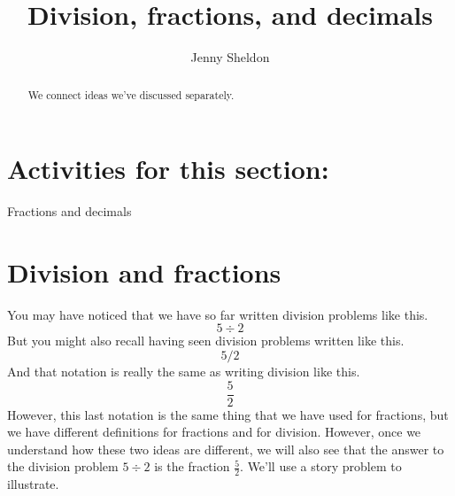 \documentclass{ximera}
\title{Division, fractions, and decimals}
\author{Jenny Sheldon}
\begin{document}
\begin{abstract}
We connect ideas we've discussed separately.
\end{abstract}
\maketitle

\section{Activities for this section:} Fractions and decimals

\section{Division and fractions}

You may have noticed that we have so far written division problems like this.
\[
5 \div 2
\]
But you might also recall having seen division problems written like this.
\[
5 / 2
\]
And that notation is really the same as writing division like this.
\[
\frac{5}{2}
\]
However, this last notation is the same thing that we have used for fractions, but we have  different definitions for fractions and for division. However, once we understand how these two ideas are different, we will also see that the answer to the division problem $5 \div 2$ is  the fraction $\frac{5}{2}$. We'll use a story problem to illustrate.
\end{document}
